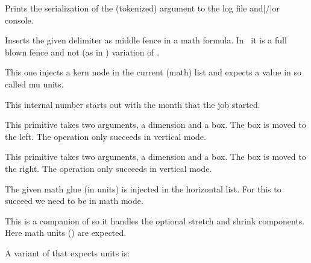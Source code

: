 \startoldprimitive[title={\prm {message}}]

Prints the serialization of the (tokenized) argument to the log file and|/|or
console.

\stopoldprimitive

\startoldprimitive[title={\prm {middle}}]

Inserts the given delimiter as middle fence in a math formula. In \LUAMETATEX\ it
is a full blown fence and not (as in \ETEX) variation of .

\stopoldprimitive

\startoldprimitive[title={\prm {mkern}}]

This one injects a kern node in the current (math) list and expects a value in so
called mu units.

\stopoldprimitive

\startoldprimitive[title={\prm {month}}]

This internal number starts out with the month that the job started.

\stopoldprimitive

\startoldprimitive[title={\prm {moveleft}}]

This primitive takes two arguments, a dimension and a box. The box is moved to
the left. The operation only succeeds in vertical mode.

\stopoldprimitive

\startoldprimitive[title={\prm {moveright}}]

This primitive takes two arguments, a dimension and a box. The box is moved to
the right. The operation only succeeds in vertical mode.

\stopoldprimitive

\startoldprimitive[title={\prm {mskip}}]

The given math glue (in  units) is injected in the horizontal list. For
this to succeed we need to be in math mode.

\stopoldprimitive

\startoldprimitive[title={\prm {muexpr}}]

This is a companion of  so it handles the optional stretch and
shrink components. Here math units () are expected.

\stopoldprimitive

\startnewprimitive[title={\prm {mugluespecdef}}]

A variant of  that expects  units is:

